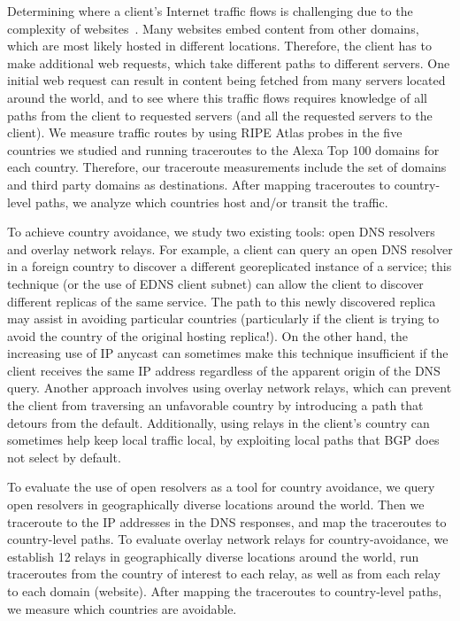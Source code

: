 Determining where a client's Internet traffic flows is challenging due to the
 complexity of websites~\cite{butkiewicz2011understanding}.  Many
websites embed content from other domains, which are most likely
hosted in different locations.  Therefore, the client has to make
additional web requests, which take different paths to different servers.  One initial web
request can result in content being fetched from many servers located
around the world, and to see where this traffic flows requires knowledge
of all paths from the client to requested servers (and all the requested
servers to the client).  We measure traffic routes by using RIPE 
Atlas probes in the five countries we studied and running traceroutes to 
the Alexa Top 100 domains for each country.  Therefore, our traceroute measurements include the 
set of domains and third party domains as destinations.  After mapping 
traceroutes to country-level paths, we analyze which 
countries host and/or transit the traffic.

To achieve country avoidance, we study two existing tools: open DNS resolvers 
and overlay network relays. For
example, a client can query an open DNS resolver in a foreign country to
discover a different georeplicated instance of a service; this technique
(or the use of EDNS client subnet) can allow the client to discover
different replicas of the same service. The path to this newly
discovered replica may assist in avoiding particular countries
(particularly if the client is trying to avoid the country of the
original hosting replica!).  On the other hand, the increasing use of IP anycast \cite{cicalese2015characterizing} can
sometimes make this technique insufficient if the client
receives the same IP address regardless of the apparent origin of the
DNS query.  Another approach involves using overlay network relays, which can
prevent the client from traversing an unfavorable country by introducing
a path that detours from the default. Additionally, using
relays in the client's country can sometimes help keep local traffic
local, by exploiting local paths that BGP does not select by default.

To evaluate the use of open resolvers as a tool for country avoidance, we
query open resolvers in geographically diverse locations around the world.  Then we traceroute 
to the IP addresses in the DNS responses, and map the traceroutes to country-level paths.  To evaluate 
overlay network relays for country-avoidance, we establish 12 relays in geographically 
diverse locations around the world, run traceroutes from the country of interest to 
each relay, as well as from each relay to each domain (website).  After mapping 
the traceroutes to country-level paths, we measure which countries are 
avoidable.

